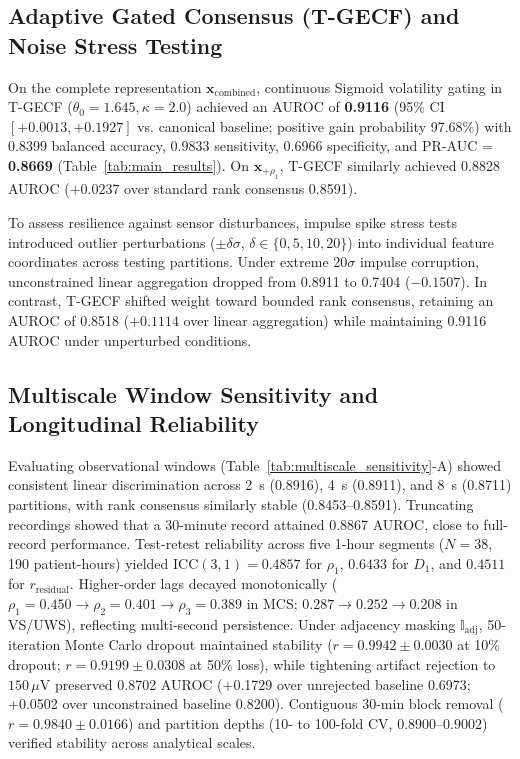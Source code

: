 \documentclass[journal,twoside,web]{ieeecolor}
\begin{document}
\vspace{-3pt}
\subsection{Adaptive Gated Consensus (T-GECF) and Noise Stress Testing}
On the complete representation $\mathbf{x}_{\text{combined}}$, continuous Sigmoid volatility gating in T-GECF ($\theta_0 = 1.645, \kappa = 2.0$) achieved an AUROC of \textbf{0.9116} (95\% CI $[+0.0013, +0.1927]$ vs. canonical baseline; positive gain probability 97.68\%) with 0.8399 balanced accuracy, 0.9833 sensitivity, 0.6966 specificity, and PR-AUC = \textbf{0.8669} (Table~\ref{tab:main_results}). On $\mathbf{x}_{+\rho_1}$, T-GECF similarly achieved 0.8828 AUROC ($+0.0237$ over standard rank consensus 0.8591).

To assess resilience against sensor disturbances, impulse spike stress tests introduced outlier perturbations ($\pm \delta\sigma$, $\delta \in \{0, 5, 10, 20\}$) into individual feature coordinates across testing partitions. Under extreme $20\sigma$ impulse corruption, unconstrained linear aggregation dropped from 0.8911 to 0.7404 ($-0.1507$). In contrast, T-GECF shifted weight toward bounded rank consensus, retaining an AUROC of 0.8518 ($+0.1114$ over linear aggregation) while maintaining 0.9116 AUROC under unperturbed conditions.

\vspace{-3pt}
\subsection{Multiscale Window Sensitivity and Longitudinal Reliability}
Evaluating observational windows (Table~\ref{tab:multiscale_sensitivity}-A) showed consistent linear discrimination across 2~s (0.8916), 4~s (0.8911), and 8~s (0.8711) partitions, with rank consensus similarly stable (0.8453--0.8591). Truncating recordings showed that a 30-minute record attained 0.8867 AUROC, close to full-record performance. Test-retest reliability across five 1-hour segments ($N=38$, 190 patient-hours) yielded $\text{ICC}(3,1) = 0.4857$ for $\rho_1$, $0.6433$ for $D_1$, and $0.4511$ for $r_{\text{residual}}$. Higher-order lags decayed monotonically ($\rho_1 = 0.450 \to \rho_2 = 0.401 \to \rho_3 = 0.389$ in MCS; $0.287 \to 0.252 \to 0.208$ in VS/UWS), reflecting multi-second persistence. Under adjacency masking $\mathbb{I}_{\text{adj}}$, 50-iteration Monte Carlo dropout maintained stability ($r = 0.9942 \pm 0.0030$ at 10\% dropout; $r = 0.9199 \pm 0.0308$ at 50\% loss), while tightening artifact rejection to $150\,\mu\mathrm{V}$ preserved 0.8702 AUROC (+0.1729 over unrejected baseline 0.6973; +0.0502 over unconstrained baseline 0.8200). Contiguous 30-min block removal ($r = 0.9840 \pm 0.0166$) and partition depths (10- to 100-fold CV, $0.8900$--$0.9002$) verified stability across analytical scales.
\end{document}
